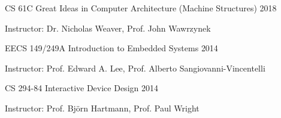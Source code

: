 
\begin{cvhonors}

  \cvhonor
  {CS 61C}
  {Great Ideas in Computer Architecture (Machine Structures)}
  {}
  {2018}

  \cvsubhonor
  {Instructor: Dr. Nicholas Weaver, Prof. John Wawrzynek}
  
  \cvhonor
  {EECS 149/249A}
  {Introduction to Embedded Systems}
  {}
  {2014}

  \cvsubhonor
  {Instructor: Prof. Edward A. Lee, Prof. Alberto Sangiovanni-Vincentelli}
  
  \cvhonor
  {CS 294-84}
  {Interactive Device Design}
  {}
  {2014}

  \cvsubhonor
  {Instructor: Prof. Bj\"orn Hartmann, Prof. Paul Wright}
  
\end{cvhonors}

